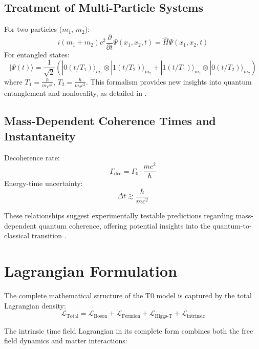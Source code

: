 \documentclass[12pt,a4paper]{article}
\begin{document}
	\subsection{Treatment of Multi-Particle Systems}
	For two particles (\( m_1 \), \( m_2 \)):
	\begin{equation}
		i (m_1 + m_2) c^2 \frac{\partial}{\partial t} \Psi(x_1, x_2, t) = \hat{H} \Psi(x_1, x_2, t)
	\end{equation}
	For entangled states:
	\begin{equation}
		|\Psi(t)\rangle = \frac{1}{\sqrt{2}}(|0(t/T_1)\rangle_{m_1} \otimes |1(t/T_2)\rangle_{m_2} + |1(t/T_1)\rangle_{m_1} \otimes |0(t/T_2)\rangle_{m_2})
	\end{equation}
	where \( T_1 = \frac{\hbar}{m_1 c^2} \), \( T_2 = \frac{\hbar}{m_2 c^2} \). This formalism provides new insights into quantum entanglement and nonlocality, as detailed in \cite{pascher_feldtheorie_2025}.
	
	\subsection{Mass-Dependent Coherence Times and Instantaneity}
	Decoherence rate:
	\begin{equation}
		\Gamma_{\text{dec}} = \Gamma_0 \cdot \frac{m c^2}{\hbar}
	\end{equation}
	Energy-time uncertainty:
	\begin{equation}
		\Delta t \gtrsim \frac{\hbar}{mc^2}
	\end{equation}
	
	These relationships suggest experimentally testable predictions regarding mass-dependent quantum coherence, offering potential insights into the quantum-to-classical transition \cite{pascher_erweiterung_2025}.
	
\section{Lagrangian Formulation}
The complete mathematical structure of the T0 model is captured by the total Lagrangian density:
\begin{equation}
	\mathcal{L}_{\text{Total}} = \mathcal{L}_{\text{Boson}} + \mathcal{L}_{\text{Fermion}} + \mathcal{L}_{\text{Higgs-T}} + \mathcal{L}_{\text{intrinsic}}
\end{equation}

The intrinsic time field Lagrangian in its complete form combines both the free field dynamics and matter interactions:
\end{document}
